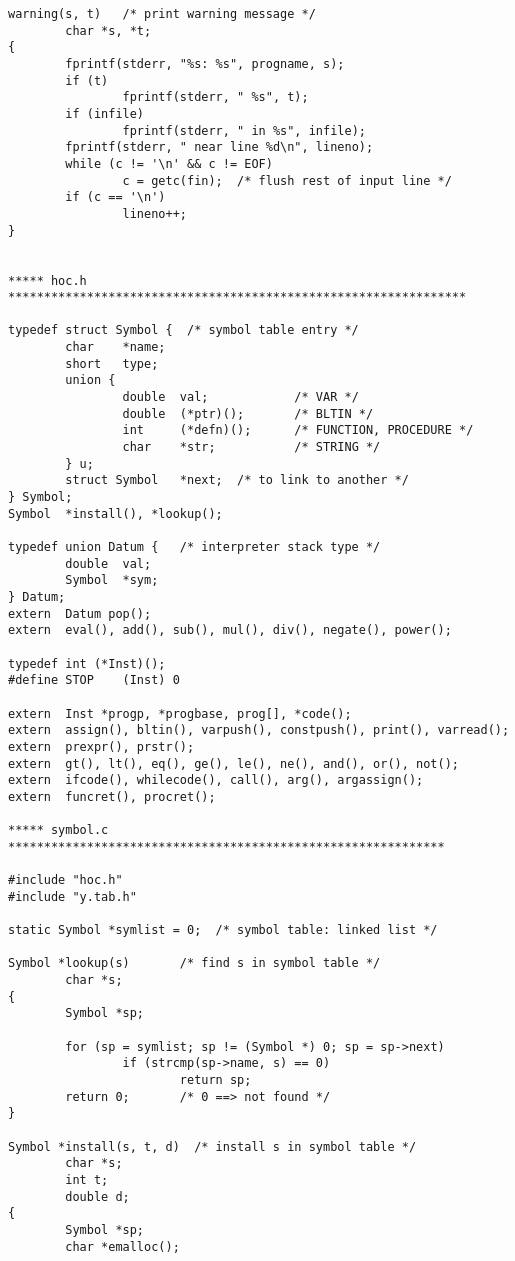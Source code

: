 \begin{verbatim}
warning(s, t)   /* print warning message */
        char *s, *t;
{
        fprintf(stderr, "%s: %s", progname, s);
        if (t)
                fprintf(stderr, " %s", t);
        if (infile)
                fprintf(stderr, " in %s", infile);
        fprintf(stderr, " near line %d\n", lineno);
        while (c != '\n' && c != EOF)
                c = getc(fin);  /* flush rest of input line */
        if (c == '\n')
                lineno++;
}


***** hoc.h ****************************************************************

typedef struct Symbol {  /* symbol table entry */
        char    *name;
        short   type;
        union {
                double  val;            /* VAR */
                double  (*ptr)();       /* BLTIN */
                int     (*defn)();      /* FUNCTION, PROCEDURE */
                char    *str;           /* STRING */
        } u;
        struct Symbol   *next;  /* to link to another */
} Symbol;
Symbol  *install(), *lookup();

typedef union Datum {   /* interpreter stack type */
        double  val;
        Symbol  *sym;
} Datum;
extern  Datum pop();
extern  eval(), add(), sub(), mul(), div(), negate(), power();

typedef int (*Inst)();
#define STOP    (Inst) 0

extern  Inst *progp, *progbase, prog[], *code();
extern  assign(), bltin(), varpush(), constpush(), print(), varread();
extern  prexpr(), prstr();
extern  gt(), lt(), eq(), ge(), le(), ne(), and(), or(), not();
extern  ifcode(), whilecode(), call(), arg(), argassign();
extern  funcret(), procret();

***** symbol.c *************************************************************

#include "hoc.h"
#include "y.tab.h"

static Symbol *symlist = 0;  /* symbol table: linked list */

Symbol *lookup(s)       /* find s in symbol table */
        char *s;
{
        Symbol *sp;

        for (sp = symlist; sp != (Symbol *) 0; sp = sp->next)
                if (strcmp(sp->name, s) == 0)
                        return sp;
        return 0;       /* 0 ==> not found */   
}

Symbol *install(s, t, d)  /* install s in symbol table */
        char *s;
        int t;
        double d;
{
        Symbol *sp;
        char *emalloc();


\end{verbatim}
